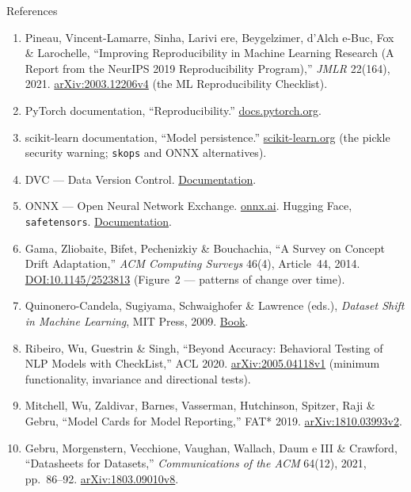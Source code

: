 \begin{frame}[allowframebreaks]{References}
\begin{enumerate}
    \item Pineau, Vincent-Lamarre, Sinha, Larivi ere, Beygelzimer, d'Alch e-Buc, Fox \& Larochelle,
          ``Improving Reproducibility in Machine Learning Research (A Report from the NeurIPS 2019
          Reproducibility Program),'' \textit{JMLR} 22(164), 2021.
          \href{https://arxiv.org/abs/2003.12206v4}{arXiv:2003.12206v4} (the ML Reproducibility Checklist).
    \item PyTorch documentation, ``Reproducibility.''
          \href{https://docs.pytorch.org/docs/stable/notes/randomness.html}{docs.pytorch.org}.
    \item scikit-learn documentation, ``Model persistence.''
          \href{https://scikit-learn.org/stable/model_persistence.html}{scikit-learn.org}
          (the pickle security warning; \texttt{skops} and ONNX alternatives).
    \item DVC --- Data Version Control. \href{https://dvc.org/doc}{Documentation}.
    \item ONNX --- Open Neural Network Exchange. \href{https://onnx.ai/}{onnx.ai}.
          Hugging Face, \texttt{safetensors}. \href{https://huggingface.co/docs/safetensors}{Documentation}.

    \item Gama, Zliobaite, Bifet, Pechenizkiy \& Bouchachia, ``A Survey on Concept Drift Adaptation,''
          \textit{ACM Computing Surveys} 46(4), Article~44, 2014.
          \href{https://dl.acm.org/doi/10.1145/2523813}{DOI:10.1145/2523813}
          (Figure~2 --- patterns of change over time).
    \item Quinonero-Candela, Sugiyama, Schwaighofer \& Lawrence (eds.), \textit{Dataset Shift in Machine
          Learning}, MIT Press, 2009.
          \href{https://mitpress.mit.edu/9780262545877/dataset-shift-in-machine-learning/}{Book}.
    \item Ribeiro, Wu, Guestrin \& Singh, ``Beyond Accuracy: Behavioral Testing of NLP Models with
          CheckList,'' ACL 2020. \href{https://arxiv.org/abs/2005.04118v1}{arXiv:2005.04118v1}
          (minimum functionality, invariance and directional tests).

    \item Mitchell, Wu, Zaldivar, Barnes, Vasserman, Hutchinson, Spitzer, Raji \& Gebru,
          ``Model Cards for Model Reporting,'' FAT* 2019.
          \href{https://arxiv.org/abs/1810.03993v2}{arXiv:1810.03993v2}.
    \item Gebru, Morgenstern, Vecchione, Vaughan, Wallach, Daum e III \& Crawford,
          ``Datasheets for Datasets,'' \textit{Communications of the ACM} 64(12), 2021, pp.~86--92.
          \href{https://arxiv.org/abs/1803.09010v8}{arXiv:1803.09010v8}.


\end{enumerate}
\end{frame}

